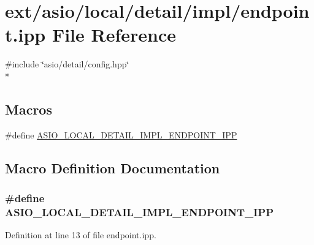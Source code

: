 \hypertarget{local_2detail_2impl_2endpoint_8ipp}{}\section{ext/asio/local/detail/impl/endpoint.ipp File Reference}
\label{local_2detail_2impl_2endpoint_8ipp}
{\ttfamily \#include \char`\"{}asio/detail/config.\+hpp\char`\"{}}\\*
\subsection*{Macros}
\begin{DoxyCompactItemize}
\item 
\#define \hyperlink{local_2detail_2impl_2endpoint_8ipp_af2ed99f7f6305b8549244d0b470ddff4}{A\+S\+I\+O\+\_\+\+L\+O\+C\+A\+L\+\_\+\+D\+E\+T\+A\+I\+L\+\_\+\+I\+M\+P\+L\+\_\+\+E\+N\+D\+P\+O\+I\+N\+T\+\_\+\+I\+P\+P}
\end{DoxyCompactItemize}


\subsection{Macro Definition Documentation}
\hypertarget{local_2detail_2impl_2endpoint_8ipp_af2ed99f7f6305b8549244d0b470ddff4}{}
\subsubsection[{A\+S\+I\+O\+\_\+\+L\+O\+C\+A\+L\+\_\+\+D\+E\+T\+A\+I\+L\+\_\+\+I\+M\+P\+L\+\_\+\+E\+N\+D\+P\+O\+I\+N\+T\+\_\+\+I\+P\+P}]{\setlength{\rightskip}{0pt plus 5cm}\#define A\+S\+I\+O\+\_\+\+L\+O\+C\+A\+L\+\_\+\+D\+E\+T\+A\+I\+L\+\_\+\+I\+M\+P\+L\+\_\+\+E\+N\+D\+P\+O\+I\+N\+T\+\_\+\+I\+P\+P}\label{local_2detail_2impl_2endpoint_8ipp_af2ed99f7f6305b8549244d0b470ddff4}


Definition at line 13 of file endpoint.\+ipp.

